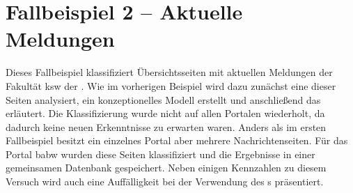 \section{Fallbeispiel 2 -- Aktuelle Meldungen}
    \label{section:findingsCaseStudy2}
    Dieses Fallbeispiel klassifiziert Übersichtsseiten mit aktuellen
    Meldungen der Fakultät \gls{ksw} der {\fernUni}.
    Wie im vorherigen Beispiel wird dazu zunächst eine dieser Seiten analysiert,
    ein konzeptionelles Modell erstellt
    und anschließend das {\classificationModel} erläutert.
    Die Klassifizierung wurde nicht auf allen Portalen wiederholt,
    da dadurch keine neuen Erkenntnisse zu erwarten waren.
    Anders als im ersten Fallbeispiel besitzt ein einzelnes Portal aber
    mehrere Nachrichtenseiten.
    Für das Portal \gls{babw} wurden diese Seiten klassifiziert und die Ergebnisse in einer gemeinsamen Datenbank gespeichert.
    Neben einigen Kennzahlen zu diesem Versuch wird auch eine Auffälligkeit bei der Verwendung des {\wordpressCrawler}s präsentiert.

    
    
    
    
